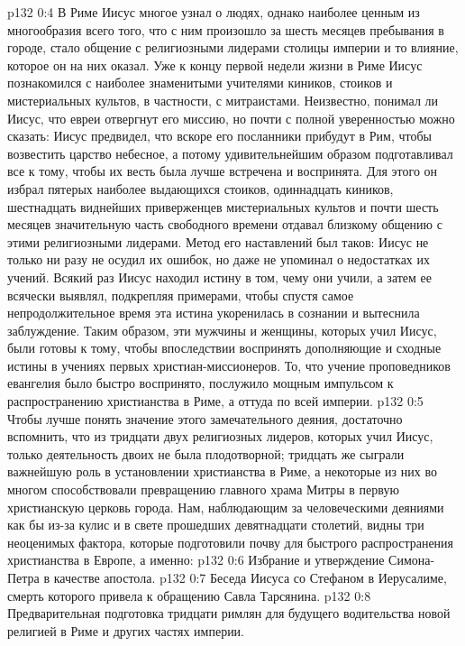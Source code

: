 \vs p132 0:4 В Риме Иисус многое узнал о людях, однако наиболее ценным из многообразия всего того, что с ним произошло за шесть месяцев пребывания в городе, стало общение с религиозными лидерами столицы империи и то влияние, которое он на них оказал. Уже к концу первой недели жизни в Риме Иисус познакомился с наиболее знаменитыми учителями киников, стоиков и мистериальных культов, в частности, с митраистами. Неизвестно, понимал ли Иисус, что евреи отвергнут его миссию, но почти с полной уверенностью можно сказать: Иисус предвидел, что вскоре его посланники прибудут в Рим, чтобы возвестить царство небесное, а потому удивительнейшим образом подготавливал все к тому, чтобы их весть была лучше встречена и воспринята. Для этого он избрал пятерых наиболее выдающихся стоиков, одиннадцать киников, шестнадцать виднейших приверженцев мистериальных культов и почти шесть месяцев значительную часть свободного времени отдавал близкому общению с этими религиозными лидерами. Метод его наставлений был таков: Иисус не только ни разу не осудил их ошибок, но даже не упоминал о недостатках их учений. Всякий раз Иисус находил истину в том, чему они учили, а затем ее всячески выявлял, подкрепляя примерами, чтобы спустя самое непродолжительное время эта истина укоренилась в сознании и вытеснила заблуждение. Таким образом, эти мужчины и женщины, которых учил Иисус, были готовы к тому, чтобы впоследствии воспринять дополняющие и сходные истины в учениях первых христиан\hyp{}миссионеров. То, что учение проповедников евангелия было быстро воспринято, послужило мощным импульсом к распространению христианства в Риме, а оттуда по всей империи.
\vs p132 0:5 Чтобы лучше понять значение этого замечательного деяния, достаточно вспомнить, что из тридцати двух религиозных лидеров, которых учил Иисус, только деятельность двоих не была плодотворной; тридцать же сыграли важнейшую роль в установлении христианства в Риме, а некоторые из них во многом способствовали превращению главного храма Митры в первую христианскую церковь города. Нам, наблюдающим за человеческими деяниями как бы из\hyp{}за кулис и в свете прошедших девятнадцати столетий, видны три неоценимых фактора, которые подготовили почву для быстрого распространения христианства в Европе, а именно:
\vs p132 0:6 \bibnobreakspace Избрание и утверждение Симона\hyp{}Петра в качестве апостола.
\vs p132 0:7 \bibnobreakspace Беседа Иисуса со Стефаном в Иерусалиме, смерть которого привела к обращению Савла Тарсянина.
\vs p132 0:8 \bibnobreakspace Предварительная подготовка тридцати римлян для будущего водительства новой религией в Риме и других частях империи.
